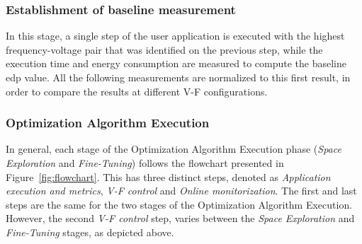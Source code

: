 


\subsubsection{Establishment of baseline measurement}

In this stage, a single step of the user application is executed with the highest frequency-voltage pair that was identified on the previous step, while the execution time and energy consumption are measured to compute the baseline \acrshort{edp} value. All the following measurements are normalized to this first result, in order to compare the results at different V-F configurations.

\subsubsection{Optimization Algorithm Execution}

In general, each stage of the Optimization Algorithm Execution phase (\textit{Space Exploration} and \textit{Fine-Tuning}) follows the flowchart presented in Figure~\ref{fig:flowchart}. This has three distinct steps, denoted as \textit{Application execution and metrics}, \textit{V-F control} and \textit{Online monitorization}. The first and last steps are the same for the two stages of the Optimization Algorithm Execution. However, the second \textit{V-F control} step, varies between the \textit{Space Exploration} and \textit{Fine-Tuning} stages, as depicted above.

